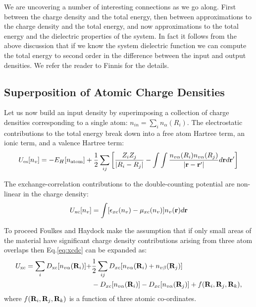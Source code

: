 

We are uncovering a number of interesting connections as we go along. First between the charge density
and the total energy, then between approximations to the charge density and the total energy, and 
now approximations to the total energy and the dielectric properties of the system. In fact
it follows from the above discussion that if we know the system dielectric function we can
compute the total energy to second order in the difference between the input and output densities.
We refer the reader to Finnis for the details.



\subsection{Superposition of Atomic Charge Densities}
Let us now build an input density by superimposing a collection of charge densities
corresponding to a single atom: $n_{in} = \sum_{i}n_{\alpha}(R_i)$. The electrostatic
contributions to the total energy break down into a free atom Hartree term, an ionic term, 
and a valence Hartree term:
%
\begin{equation}
U_{\rm es}[n_{v}] = -E_{H}[n_{\rm atom}] + \frac{1}{2}\sum_{ij} \left[ \frac{Z_{i}Z_{j}}{|R_{i}-R_{j}|} - \int\int\frac{n_{v\alpha}(R_{i})n_{v\alpha}(R_{j})}{|{\bf r}-{\bf r}'|}d{\bf r} d{\bf r}'\right]
\end{equation}

The exchange-correlation contributions to the double-counting potential are non-linear in the charge density:
%
\begin{equation}
\label{eq:xcdc}
U_{\rm xc}[n_v] = \int[\epsilon_{xc}(n_{v})-\mu_{xc}(n_{v})]n_{v}({\bf r}) d{\bf r} 
\end{equation}
%

To proceed Foulkes and Haydock make the assumption that if only small 
areas of the material have significant charge density contributions arising from three atom 
overlaps then Eq.\ref{eq:xcdc} can be expanded as:
%
\begin{align*}
\label{eq:xcdc2}
U_{\rm xc} = \sum_{i} D_{\rm xc}[n_{v\alpha}({\bf R}_{i})] + & \frac{1}{2}\sum_{ij} D_{xc}[n_{v\alpha}({\bf R}_i) + n_{v\beta}({\bf R}_{j})]  \\ 
	     & - D_{xc}[n_{v\alpha}({\bf R}_i)] - D_{xc}[n_{v\alpha}({\bf R}_j)] + f({\bf R}_i,{\bf R}_j,{\bf R}_k),
\end{align*}
%
where $f({\bf R}_i,{\bf R}_j,{\bf R}_k)$ is a function of three atomic co-ordinates.

